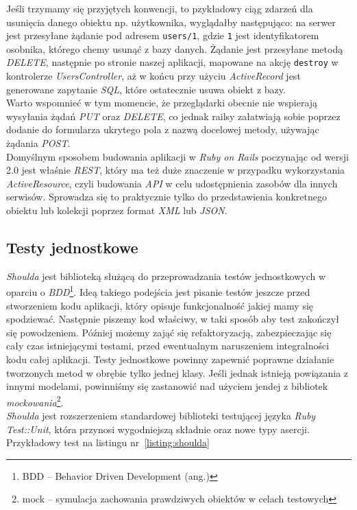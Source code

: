 \documentclass[a4paper,12pt]{article}
\begin{document}
Jeśli trzymamy się przyjętych konwencji, to pzykładowy ciąg zdarzeń dla usunięcia danego
obiektu np. użytkownika, wyglądałby następująco: na serwer jest przesyłane żądanie pod
adresem \texttt{users/1}, gdzie \texttt{1} jest identyfikatorem osobnika, którego chemy
usunąć z bazy danych. Żądanie jest przesyłane metodą \emph{DELETE}, następnie po stronie
naszej aplikacji, mapowane na akcję \texttt{destroy} w kontrolerze \emph{UsersController},
aż w końcu przy użyciu \emph{ActiveRecord} jest generowane zapytanie \emph{SQL}, które
ostatecznie usuwa obiekt z bazy.\\
Warto wspomnieć w tym momencie, że przeglądarki obecnie nie wspierają wysyłania żądań
\emph{PUT} oraz \emph{DELETE}, co jednak railsy załatwiają sobie poprzez dodanie do
formularza ukrytego pola z nazwą docelowej metody, używając żądania \emph{POST}.\\
Domyślnym sposobem budowania aplikacji w \emph{Ruby on Rails} poczynając od wersji 2.0
jest właśnie \emph{REST}, który ma też duże znaczenie w przypadku wykorzystania \emph
{ActiveResource}, czyli budowania \emph{API} w celu udostępnienia zasobów dla innych
serwisów. Sprowadza się to praktycznie tylko do przedstawienia konkretnego obiektu lub
kolekcji poprzez format \emph{XML} lub \emph{JSON}.


\subsection{Testy jednostkowe}
\emph{Shoulda} jest biblioteką służącą do przeprowadzania testów jednostkowych w oparciu o
\emph{BDD}\footnote{BDD -- Behavior Driven Development (ang.)}. Ideą takiego podejścia
jest pisanie testów jeszcze przed stworzeniem kodu aplikacji, który opisuje funkcjonalność
jakiej mamy się spodziewać. Następnie piszemy kod właściwy, w taki sposób aby test
zakończył się powodzeniem. Później możemy zająć się refaktoryzacją, zabezpieczając się
cały czas istniejącymi testami, przed ewentualnym naruszeniem integralności kodu całej
aplikacji. Testy jednostkowe powinny zapewnić poprawne działanie tworzonych metod w
obrębie tylko jednej klasy. Jeśli jednak istnieją powiązania z innymi modelami, powinniśmy
się zastanowić nad użyciem jendej z bibliotek \emph{mockowania}\footnote{mock -- symulacja
zachowania prawdziwych obiektów w celach testowych}.\\
\emph{Shoulda} jest rozszerzeniem standardowej biblioteki testującej języka \emph{Ruby}
\emph{Test::Unit}, która przynosi wygodniejszą składnie oraz nowe typy asercji.
Przykładowy test na listingu nr~\ref{listing:shoulda}
\end{document}
